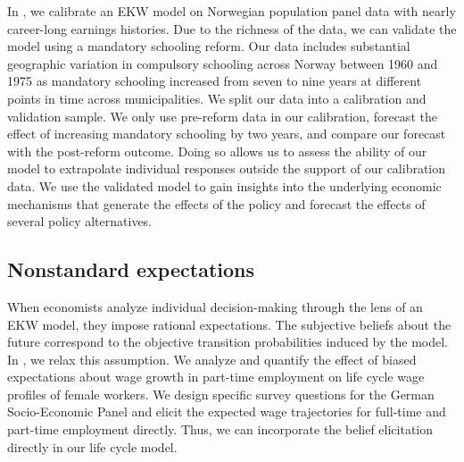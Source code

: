 \noindent In \citet{Bhuller.2018}, we calibrate an EKW model on Norwegian population panel data with nearly career-long earnings histories. Due to the richness of the data, we can validate the model using a mandatory schooling reform. Our data includes substantial geographic variation in compulsory schooling across Norway between 1960 and 1975 as mandatory schooling increased from seven to nine years at different points in time across municipalities. We split our data into a calibration and validation sample. We only use pre-reform data in our calibration, forecast the effect of increasing mandatory schooling by two years, and compare our forecast with the post-reform outcome. Doing so allows us to assess the ability of our model to extrapolate individual responses outside the support of our calibration data. We use the validated model to gain insights into the underlying economic mechanisms that generate the effects of the policy and forecast the effects of several policy alternatives.
\subsection{Nonstandard expectations}
When economists analyze individual decision-making through the lens of an EKW model, they impose rational expectations. The subjective beliefs about the future correspond to the objective transition probabilities induced by the model.\\

\noindent In \citet{Eisenhauer.2020a}, we relax this assumption. We analyze and quantify the effect of biased expectations about wage growth in part-time employment on life cycle wage profiles of female workers. We design specific survey questions for the German Socio-Economic Panel \citep{Goebel.2019} and elicit the expected wage trajectories for full-time and part-time employment directly. Thus, we can incorporate the belief elicitation directly in our life cycle model.
